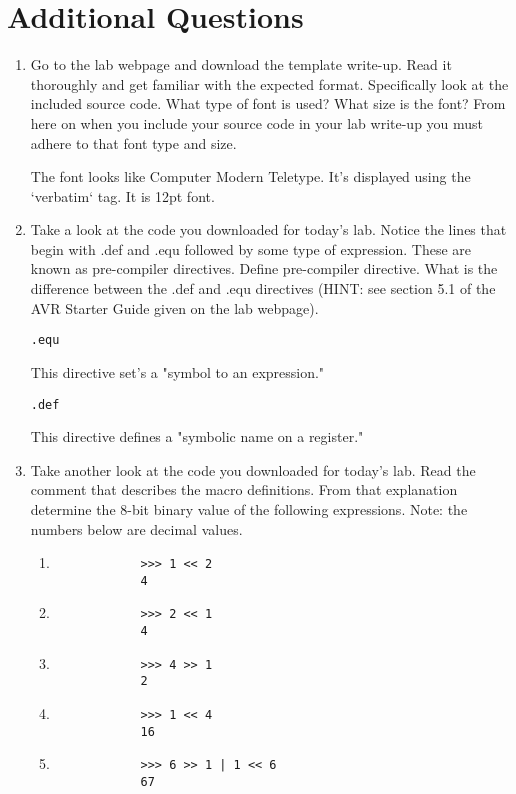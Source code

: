 \documentclass[12pt,letterpaper]{article}
\begin{document}
\section{Additional Questions}
\begin{enumerate}
    \item
    Go to the lab webpage and download the template write-up. Read it thoroughly and get familiar
    with the expected format.  Specifically look at the included source code. What type of font is
    used? What size is the font? From here on when you include your source code in your lab write-up
    you must adhere to that font type and size.


    The font looks like Computer Modern Teletype. It's displayed using the `verbatim` tag. It is 12pt font.

    \item
    Take a look at the code you downloaded for today’s lab. Notice the lines that begin with .def and
    .equ followed by some type of expression. These are known as pre-compiler directives. Define
    pre-compiler directive. What is the difference between the .def and .equ directives (HINT: see
    section 5.1 of the AVR Starter Guide given on the lab webpage).

    \begin{verbatim}.equ\end{verbatim}
    This directive set's a "symbol to an expression."
    \begin{verbatim}.def\end{verbatim}
    This directive defines a "symbolic name on a register."

    \item
    Take another look at the code you downloaded for today’s lab. Read the comment that describes
    the macro definitions. From that explanation determine the 8-bit binary value of the following
    expressions. Note: the numbers below are decimal values.

    \begin{enumerate}
        \item
            \begin{verbatim}
            >>> 1 << 2
            4\end{verbatim}
        \item
            \begin{verbatim}
            >>> 2 << 1
            4
            \end{verbatim}
        \item
            \begin{verbatim}
            >>> 4 >> 1
            2
            \end{verbatim}
        \item
            \begin{verbatim}
            >>> 1 << 4
            16
            \end{verbatim}
        \item
            \begin{verbatim}
            >>> 6 >> 1 | 1 << 6
            67
            \end{verbatim}
    \end{enumerate}

\end{enumerate}
\end{document}
